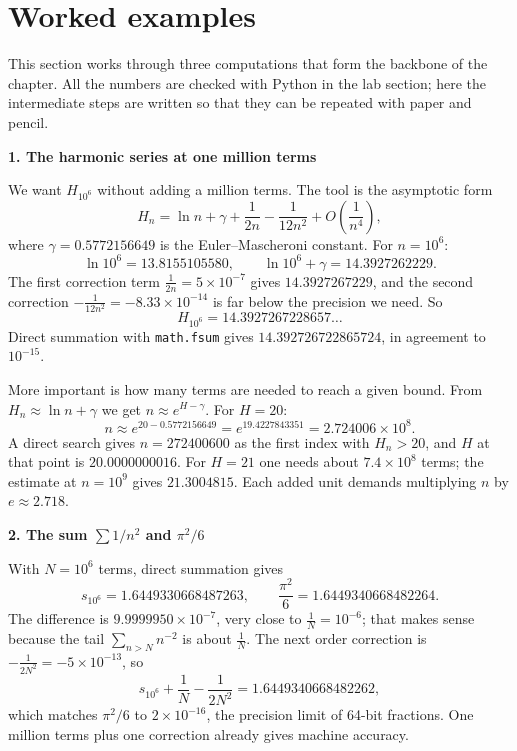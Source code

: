 \section{Worked examples}

This section works through three computations that form the backbone of the chapter. All the
numbers are checked with Python in the lab section; here the intermediate steps are written
so that they can be repeated with paper and pencil.

\medskip\noindent\textbf{1. The harmonic series at one million terms}

We want $H_{10^6}$ without adding a million terms. The tool is the asymptotic form
\[
  H_n = \ln n + \gamma + \frac{1}{2n} - \frac{1}{12n^2} + O\left(\frac{1}{n^4}\right),
\]
where $\gamma = 0.5772156649$ is the Euler--Mascheroni constant. For $n = 10^6$:
\[
  \ln 10^6 = 13.8155105580, \qquad \ln 10^6 + \gamma = 14.3927262229 .
\]
The first correction term $\frac{1}{2n} = 5 \times 10^{-7}$ gives $14.3927267229$, and the
second correction $-\frac{1}{12n^2} = -8.33 \times 10^{-14}$ is far below the precision we
need. So
\[
  H_{10^6} = 14.3927267228657\ldots
\]
Direct summation with \texttt{math.fsum} gives $14.392726722865724$, in agreement to
$10^{-15}$.

More important is how many terms are needed to reach a given bound. From
$H_n \approx \ln n + \gamma$ we get $n \approx e^{H - \gamma}$. For $H = 20$:
\[
  n \approx e^{20 - 0.5772156649} = e^{19.4227843351} = 2.724006 \times 10^{8}.
\]
A direct search gives $n = 272400600$ as the first index with $H_n > 20$, and $H$ at that
point is $20.0000000016$. For $H = 21$ one needs about $7.4 \times 10^8$ terms; the estimate
at $n = 10^9$ gives $21.3004815$. Each added unit demands multiplying $n$ by
$e \approx 2.718$.

\medskip\noindent\textbf{2. The sum $\sum 1/n^2$ and $\pi^2/6$}

With $N = 10^6$ terms, direct summation gives
\[
  s_{10^6} = 1.6449330668487263, \qquad \frac{\pi^2}{6} = 1.6449340668482264 .
\]
The difference is $9.9999950 \times 10^{-7}$, very close to $\frac{1}{N} = 10^{-6}$; that
makes sense because the tail $\sum_{n>N} n^{-2}$ is about $\frac{1}{N}$. The next order
correction is $-\frac{1}{2N^2} = -5 \times 10^{-13}$, so
\[
  s_{10^6} + \frac{1}{N} - \frac{1}{2N^2} = 1.6449340668482262,
\]
which matches $\pi^2/6$ to $2 \times 10^{-16}$, the precision limit of 64-bit fractions. One
million terms plus one correction already gives machine accuracy.


